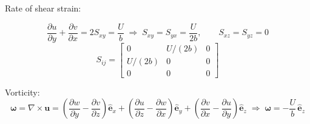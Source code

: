 \documentclass[11pt]{article}
\newcommand{\pd}[2]{\frac{\partial #1}{\partial #2}}
\newcommand{\vect}[1]{\mathbf{#1}}
\begin{document}
\noindent Rate of shear strain:

\begin{equation*}
\boxed{\pd{u}{y} + \pd{v}{x} = 2S_{xy} = \frac{U}{b}}
\;\Rightarrow\;
S_{xy} = S_{yx} = \frac{U}{2b}, \qquad S_{xz} = S_{yz} = 0
\end{equation*}
\begin{equation*}
S_{ij} =
\begin{bmatrix}
0 & U/(2b) & 0 \\
U/(2b) & 0 & 0 \\
0 & 0 & 0
\end{bmatrix}
\end{equation*}

\noindent Vorticity:
\begin{equation*}
\boldsymbol\omega = \nabla\times\vect u
= \left(\pd{w}{y} - \pd{v}{z}\right)\hat{\vect e}_x
+ \left(\pd{u}{z} - \pd{w}{x}\right)\hat{\vect e}_y
+ \left(\pd{v}{x} - \pd{u}{y}\right)\hat{\vect e}_z
\;\Rightarrow\;
\boxed{\boldsymbol\omega = -\frac{U}{b}\,\hat{\vect e}_z}
\end{equation*}
\end{document}
